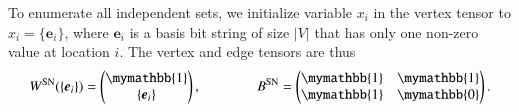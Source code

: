 \documentclass[onefignum, onetabnum]{siamart190516}
\newcommand{\<}{\langle}
\renewcommand{\>}{\rangle}
\begin{document}
To enumerate all independent sets,  we initialize variable $x_{i}$ in the vertex tensor to $x_i = \{\boldsymbol{e}_{i}\}$, where $\boldsymbol{e}_i$ is a basis bit string of size $|V|$ that has only one non-zero value at location $i$.
The vertex and edge tensors are thus
\begin{equation}
    W^{\rm SN}(\{\boldsymbol{e}_{i}\}) = \left(\begin{matrix}
        \mymathbb{1} \\
        \{\boldsymbol{e}_{i}\}
    \end{matrix}\right),   
    \qquad \qquad
        B^{\rm SN} = \left(\begin{matrix}
        \mymathbb{1}  & \mymathbb{1} \\
        \mymathbb{1} & \mymathbb{0}
    \end{matrix}\right).
\end{equation}
\end{document}
